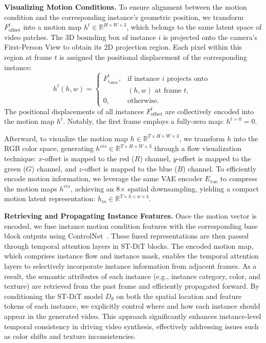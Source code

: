 \noindent \textbf{Visualizing Motion Conditions.} 
To ensure alignment between the motion condition and the corresponding instance's geometric position,  
we transform \( F_{\text{offset}}^{t} \) into a motion map \( h^t \in \mathbb{R}^{H \times W \times 3} \), which belongs to the same latent space of video patches.  
The 3D bounding box of instance \( i \) is projected onto the camera’s First-Person View to obtain its 2D projection region.  
Each pixel within this region at frame \( t \) is assigned the positional displacement of the corresponding instance:  
\begin{equation}
h^t(h, w) = 
\begin{cases}
F_{i_{\text{offset}}}^t, & \text{if instance } i \text{ projects onto } \\
                             &  (h, w) \text{ at frame } t, \\
0, & \text{otherwise.}
\end{cases}
\end{equation}
\noindent The positional displacements of all instances \( F_{\text{offset}}^{t} \) are collectively encoded into the motion map \( h^t \).  
Notably, the first frame employs a fully-zero map: \( h^{t=0} = 0 \).

\noindent Afterward, to visualize the motion map \( h \in \mathbb{R}^{T \times H \times W \times 3} \), we transform \( h \) into the RGB color space, generating \( h^{vis} \in \mathbb{R}^{T \times H \times W \times 3} \) through a flow visualization technique: \(x\)-offset is mapped to the red (\(R\)) channel, \(y\)-offset is mapped to the green (\(G\)) channel, and \(z\)-offset is mapped to the blue (\(B\)) channel.  
To efficiently encode motion information, we leverage the same VAE encoder \( E_{\text{vae}} \) to compress the motion maps \( h^{vis} \), achieving an 8× spatial downsampling, yielding a compact motion latent representation: $h_{m} \in \mathbb{R}^{T \times h \times w \times 4}$.


\noindent \textbf{Retrieving and Propagating Instance Features.}
Once the motion vector is encoded, we fuse instance motion condition features with the corresponding base block outputs using ControlNet~\cite{zhang2023adding}.  
These fused representations are then passed through temporal attention layers in ST-DiT blocks.
The encoded motion map, which comprises instance flow and instance mask, enables the temporal attention layers to selectively incorporate instance information from adjacent frames.
As a result, the semantic attributes of each instance (e.g., instance category, color, and texture) are retrieved from the past frame and efficiently propagated forward.
By conditioning the ST-DiT model \( D_{\theta} \) on both the spatial location and feature tokens of each instance, we explicitly control where and how each instance should appear in the generated video.
This approach significantly enhances instance-level temporal consistency in driving video synthesis, effectively addressing issues such as color shifts and texture inconsistencies. 

